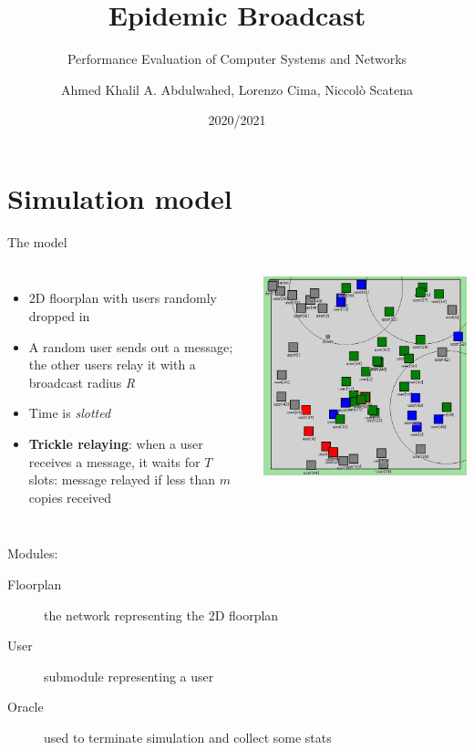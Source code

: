 \documentclass[aspectratio=169]{beamer}
\title{Epidemic Broadcast}
\subtitle{Performance Evaluation of Computer Systems and Networks}
\author[Abdulwahed, Cima, Scatena]{Ahmed Khalil A. Abdulwahed, Lorenzo Cima, Niccolò Scatena}
\institute[UNIPI]{University of Pisa}
\date{2020/2021}
\begin{document}
\begin{frame}
	\titlepage{}
\end{frame}

\section{Simulation model}

\begin{frame}{The model}
	\begin{columns}
		\begin{itemize}
			\item 2D floorplan with users randomly dropped in
			\item A random user sends out a message; the other users
				relay it with a broadcast radius \emph{R}
			\item Time is \emph{slotted}
			\item \textbf{Trickle relaying}: when a user receives a
				message, it waits for \(T\) slots: message
				relayed if less than \(m\) copies received
		\end{itemize}
		\includegraphics[width=\textwidth]{img/snapshot}
	\end{columns}
	Modules:
	\begin{description}
		\item[Floorplan] the network representing the 2D
			floorplan
		\item[User] submodule representing a user
		\item[Oracle] used to terminate simulation and collect
			some stats
	\end{description}
\end{frame}
\end{document}
